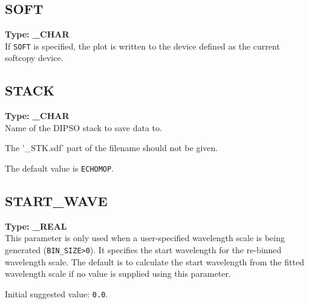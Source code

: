 \documentclass[11pt,twoside]{article}
\makeatletter
\newcommand{\htmlref}[2]{#1}
\newcommand{\xlabel}[1]{}
\newcommand{\indexcmdname}[1]{\index{#1@\protect\cmdname{#1}}}
\renewcommand{\indexcmdname}[1]{}
\newcommand{\cmdname}{\begingroup \catcode`\_=12 \realcmdname}
\newcommand{\realcmdname}[1]{\endgroup\texttt{#1}}
\newcommand{\echparameter}[4]
{
\item [#1 = #3] \mbox{}\label{par_#2}\indexcmdname{#2}
\\
#4
}
\renewcommand{\echparameter}[4]
{
  \subsection{\xlabel{par_#2}\label{par_#2}{\bf #1}}
  {\bf Type: #3}\\
#4
}
\makeatother
\begin{document}
\echparameter{SOFT}{SOFT}{
 \_CHAR
}{
 If \texttt{SOFT} is specified, the plot is written to the device defined as
 the current softcopy device.
}

\echparameter{STACK}{STACK}{
 \_CHAR
}{
 Name of the DIPSO stack to save data to.

 The '\_STK.sdf' part of the filename should not be given.

 The default value is \texttt{ECHOMOP}.
}

\echparameter{START\_WAVE}{START_WAVE}{
 \_REAL
}{
 This parameter is only used when a user-specified wavelength scale
 is being generated (\htmlref{{\tt{BIN\_SIZE>0}}}{par_BIN_SIZE}).
 It specifies the start wavelength
 for the re-binned wavelength scale.  The default is to calculate the
 start wavelength from the fitted wavelength scale if no value is
 supplied using this parameter.

 Initial suggested value: \texttt{0.0}.
}
\end{document}
